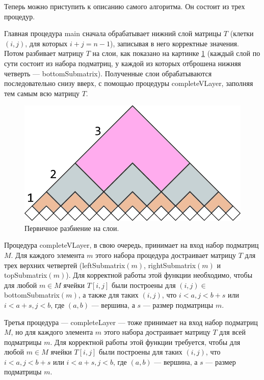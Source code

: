 \documentclass[12pt]{article}  %
\theoremstyle{definition}
\theoremstyle{remark}
\begin{document}
Теперь можно приступить к описанию самого алгоритма. Он состоит из трех процедур.

Главная процедура main сначала обрабатывает нижний слой матрицы $T$ (клетки $(i,j)$, для которых $i+j=n-1$), записывая в него корректные значения. Потом разбивает матрицу $T$ на слои, как показано на картинке \ref{gr:layers} (каждый слой по сути состоит из набора подматриц, у каждой из которых отброшена нижняя четверть --- bottomSubmatrix). Полученные слои обрабатываются последовательно снизу вверх, с помощью процедуры completeVLayer, заполняя тем самым всю матрицу $T$. 

\begin{figure}[!ht]
  \caption{Первичное разбиение на слои.}
  \label{gr:layers}
  \centering
    \includegraphics[width=0.9\linewidth]{layers.png}
\end{figure}

Процедура completeVLayer, в свою очередь, принимает на вход набор подматриц $M$. Для каждого элемента $m$ этого набора процедура достраивает матрицу $T$ для трех верхних четвертей (leftSubmatrix$(m)$, \linebreak rightSubmatrix$(m)$ и topSubmatrix$(m)$). Для корректной работы этой функции необходимо, чтобы для любой $m \in M$ ячейки $T[i,j]$ были построены  для $(i,j) \in\ $bottomSubmatrix$(m)$, а также для таких $(i,j)$, что $i < a, j < b+s$ или $i < a+s, j < b$, где $(a,b)$ --- вершина, а $s$ --- размер подматрицы $m$. 

Третья процедура --- completeLayer --- тоже принимает на вход набор подматриц $M$, но для каждого элемента $m$ этого набора достраивает матрицу $T$ для всей подматрицы $m$. Для корректной работы этой функции требуется, чтобы для любой $m \in M$ ячейки $T[i,j]$ были построены для таких $(i,j)$, что $i < a, j < b+s$ или $i < a+s, j < b$, где $(a,b)$ --- вершина, а $s$ --- размер подматрицы $m$. 
\end{document}
